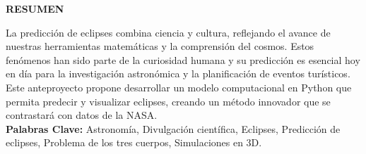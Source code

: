 \setcounter{section}{0}
\begin{singlespace}

    \huge{\textbf{RESUMEN}} 

    \normalsize

    La predicción de eclipses combina ciencia y cultura, reflejando el avance de nuestras herramientas matemáticas
    y la comprensión del cosmos. Estos fenómenos han sido parte de la curiosidad humana y su predicción es esencial
    hoy en día para la investigación astronómica y la planificación de eventos turísticos. Este anteproyecto propone
    desarrollar un modelo computacional en Python que permita predecir y visualizar eclipses, creando un método innovador
    que se contrastará con datos de la NASA.\\
    \textbf{Palabras Clave:} 
    Astronomía, Divulgación científica, Eclipses, Predicción de eclipses, Problema de los tres cuerpos, Simulaciones en 3D.
    
\end{singlespace}